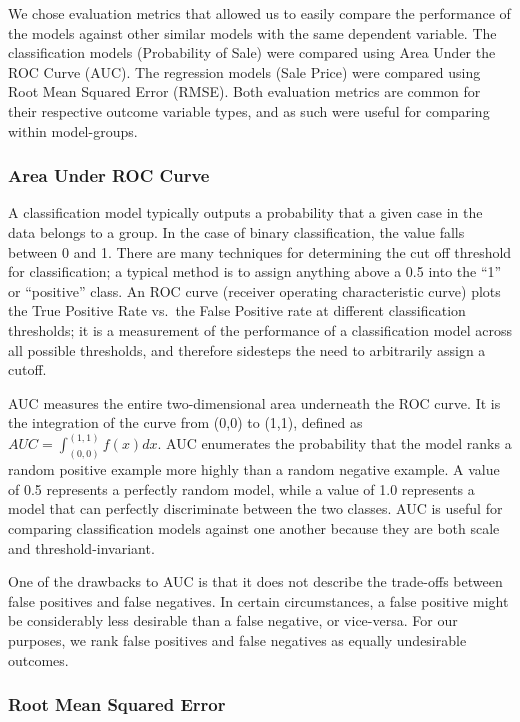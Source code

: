 \documentclass[12pt,]{article}
\begin{document}
We chose evaluation metrics that allowed us to easily compare the
performance of the models against other similar models with the same
dependent variable. The classification models (Probability of Sale) were
compared using Area Under the ROC Curve (AUC). The regression models
(Sale Price) were compared using Root Mean Squared Error (RMSE). Both
evaluation metrics are common for their respective outcome variable
types, and as such were useful for comparing within model-groups.

\hypertarget{area-under-roc-curve}{%
\subsubsection{Area Under ROC Curve}\label{area-under-roc-curve}}

A classification model typically outputs a probability that a given case
in the data belongs to a group. In the case of binary classification,
the value falls between 0 and 1. There are many techniques for
determining the cut off threshold for classification; a typical method
is to assign anything above a 0.5 into the ``1'' or ``positive'' class.
An ROC curve (receiver operating characteristic curve) plots the True
Positive Rate vs.~the False Positive rate at different classification
thresholds; it is a measurement of the performance of a classification
model across all possible thresholds, and therefore sidesteps the need
to arbitrarily assign a cutoff.

AUC measures the entire two-dimensional area underneath the ROC curve.
It is the integration of the curve from (0,0) to (1,1), defined as
\(AUC = \int_{(0,0)}^{(1,1)} f(x)dx\). AUC enumerates the probability
that the model ranks a random positive example more highly than a random
negative example. A value of 0.5 represents a perfectly random model,
while a value of 1.0 represents a model that can perfectly discriminate
between the two classes. AUC is useful for comparing classification
models against one another because they are both scale and
threshold-invariant.

One of the drawbacks to AUC is that it does not describe the trade-offs
between false positives and false negatives. In certain circumstances, a
false positive might be considerably less desirable than a false
negative, or vice-versa. For our purposes, we rank false positives and
false negatives as equally undesirable outcomes.

\hypertarget{root-mean-squared-error}{%
\subsubsection{Root Mean Squared Error}\label{root-mean-squared-error}}
\end{document}
